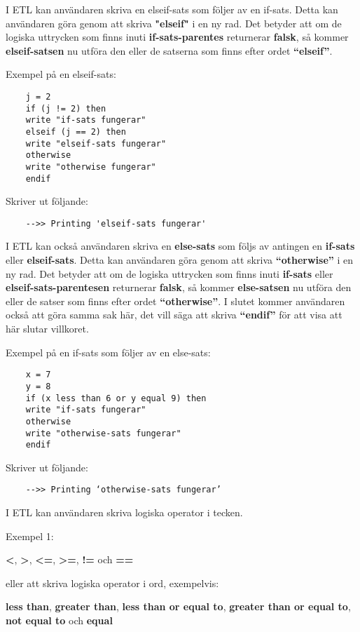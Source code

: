 \documentclass{TDP019mall}
\begin{document}
I ETL kan användaren skriva en elseif-sats som följer av en if-sats. Detta kan användaren göra genom att skriva \textbf{"elseif"} i 
en ny rad. Det betyder att om de logiska uttrycken som finns inuti \textbf{if-sats-parentes} returnerar \textbf{falsk}, 
så kommer \textbf{elseif-satsen} nu utföra den eller de satserna som finns efter ordet \textbf{“elseif”}. 

\newpage
Exempel på en elseif-sats: 

\begin{verbatim}
    j = 2
    if (j != 2) then
    write "if-sats fungerar"
    elseif (j == 2) then
    write "elseif-sats fungerar"
    otherwise
    write "otherwise fungerar"
    endif
\end{verbatim}

Skriver ut följande:
\begin{verbatim}
    -->> Printing 'elseif-sats fungerar' 
\end{verbatim}

I ETL kan också användaren skriva en \textbf{else-sats} som följs av antingen en \textbf{if-sats} eller \textbf{elseif-sats}. 
Detta kan användaren göra genom att skriva \textbf{“otherwise”} i 
en ny rad. Det betyder att om de logiska uttrycken som finns inuti \textbf{if-sats} eller \textbf{elseif-sats-parentesen} returnerar \textbf{falsk}, 
så kommer \textbf{else-satsen} nu utföra den eller 
de satser som finns efter ordet \textbf{“otherwise”}. I slutet kommer användaren också att göra samma sak här, det vill säga att skriva \textbf{“endif”} 
för att visa att här slutar villkoret.

Exempel på en if-sats som följer av en else-sats: 
\begin{verbatim}
    x = 7
    y = 8
    if (x less than 6 or y equal 9) then
    write "if-sats fungerar"
    otherwise
    write "otherwise-sats fungerar"
    endif
\end{verbatim} 

Skriver ut följande:
\begin{verbatim}
    -->> Printing ‘otherwise-sats fungerar’
\end{verbatim}

I ETL kan användaren skriva logiska operator i tecken.

Exempel 1: 

\textbf{<}, \textbf{>}, \textbf{<=}, \textbf{>=}, \textbf{!=} och \textbf{==} 

eller att skriva logiska operator i ord, exempelvis:

\textbf{less than}, \textbf{greater than}, \textbf{less than or equal to}, \textbf{greater than or equal to}, \textbf{not equal to} och \textbf{equal} 
\break 
\end{document}
